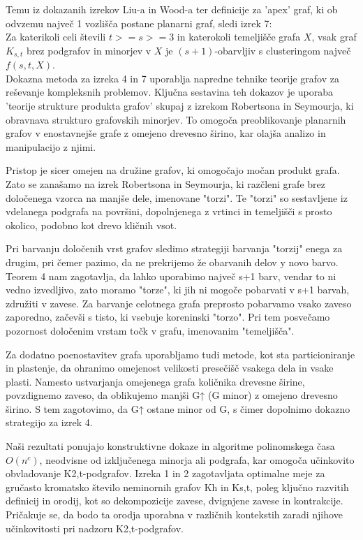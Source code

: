 \documentclass{article}
\begin{document}
Temu iz dokazanih izrekov Liu-a in Wood-a ter definicije za 'apex' graf, ki ob odvzemu največ 1 vozlišča postane planarni graf, sledi izrek 7:\\
Za katerikoli celi števili $t >= s >= 3$ in katerokoli temeljišče grafa $X$, vsak graf $K_{s,t}$ brez podgrafov in minorjev v $X$ je $(s + 1)$-obarvljiv s clusteringom največ $f(s, t, X)$.\\

Dokazna metoda za izreka 4 in 7 uporablja napredne tehnike teorije grafov za reševanje kompleksnih problemov. Ključna sestavina teh dokazov je uporaba 'teorije strukture produkta grafov' skupaj z izrekom Robertsona in Seymourja, ki obravnava strukturo grafovskih minorjev. To omogoča preoblikovanje planarnih grafov v enostavnejše grafe z omejeno drevesno širino, kar olajša analizo in manipulacijo z njimi.

Pristop je sicer omejen na družine grafov, ki omogočajo močan produkt grafa. Zato se zanašamo na izrek Robertsona in Seymourja, ki razčleni grafe brez določenega vzorca na manjše dele, imenovane "torzi". Te "torzi" so sestavljene iz vdelanega podgrafa na površini, dopolnjenega z vrtinci in temeljišči s prosto okolico, podobno kot drevo kličnih vsot.

Pri barvanju določenih vrst grafov sledimo strategiji barvanja "torzij" enega za drugim, pri čemer pazimo, da ne prekrijemo že obarvanih delov y novo barvo. Teorem 4 nam zagotavlja, da lahko uporabimo največ s+1 barv, vendar to ni vedno izvedljivo, zato moramo "torze", ki jih ni mogoče pobarvati v s+1 barvah, združiti v zavese. Za barvanje celotnega grafa preprosto pobarvamo vsako zaveso zaporedno, začevši s tisto, ki vsebuje koreninski "torzo". Pri tem posvečamo pozornost določenim vrstam točk v grafu, imenovanim "temeljišča".

Za dodatno poenostavitev grafa uporabljamo tudi metode, kot sta particioniranje in plastenje, da ohranimo omejenost velikosti presečišč vsakega dela in vsake plasti. Namesto ustvarjanja omejenega grafa količnika drevesne širine, povzdignemo zaveso, da oblikujemo manjši G↑ (G minor) z omejeno drevesno širino. S tem zagotovimo, da G↑ ostane minor od G, s čimer dopolnimo dokazno strategijo za izrek 4.

Naši rezultati ponujajo konstruktivne dokaze in algoritme polinomskega časa $O(n^c)$, neodvisne od izključenega minorja ali podgrafa, kar omogoča učinkovito obvladovanje K2,t-podgrafov. Izreka 1 in 2 zagotavljata optimalne meje za gručasto kromatsko število neminornih grafov Kh in Ks,t, poleg ključno razvitih definicij in orodij, kot so dekompozicije zavese, dvignjene zavese in kontrakcije. Pričakuje se, da bodo ta orodja uporabna v različnih kontekstih zaradi njihove učinkovitosti pri nadzoru K2,t-podgrafov.




\end{document}
